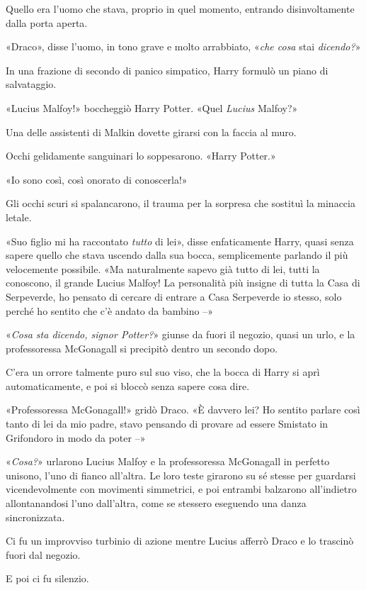 Quello era l’uomo che stava, proprio in quel momento, entrando disinvoltamente dalla porta aperta.

«Draco», disse l’uomo, in tono grave e molto arrabbiato, «\textit{che cosa} stai \textit{dicendo?}»

In una frazione di secondo di panico simpatico, Harry formulò un piano di salvataggio.

«Lucius Malfoy!» boccheggiò Harry Potter. «Quel \textit{Lucius} Malfoy?»

Una delle assistenti di Malkin dovette girarsi con la faccia al muro.

Occhi gelidamente sanguinari lo soppesarono. «Harry Potter.»

«Io sono così, così onorato di conoscerla!»

Gli occhi scuri si spalancarono, il trauma per la sorpresa che sostituì la minaccia letale.

«Suo figlio mi ha raccontato \textit{tutto} di lei», disse enfaticamente Harry, quasi senza sapere quello che stava uscendo dalla sua bocca, semplicemente parlando il più velocemente possibile. «Ma naturalmente sapevo già tutto di lei, tutti la conoscono, il grande Lucius Malfoy! La personalità più insigne di tutta la Casa di Serpeverde, ho pensato di cercare di entrare a Casa Serpeverde io stesso, solo perché ho sentito che c’è andato da bambino –»

«\textit{Cosa sta dicendo, signor Potter?}» giunse da fuori il negozio, quasi un urlo, e la professoressa McGonagall si precipitò dentro un secondo dopo.

C’era un orrore talmente puro sul suo viso, che la bocca di Harry si aprì automaticamente, e poi si bloccò senza sapere cosa dire.

«Professoressa McGonagall!» gridò Draco. «È davvero lei? Ho sentito parlare così tanto di lei da mio padre, stavo pensando di provare ad essere Smistato in Grifondoro in modo da poter –»

«\textit{Cosa?}» urlarono Lucius Malfoy e la professoressa McGonagall in perfetto unisono, l’uno di fianco all’altra. Le loro teste girarono su sé stesse per guardarsi vicendevolmente con movimenti simmetrici, e poi entrambi balzarono all’indietro allontanandosi l’uno dall’altra, come se stessero eseguendo una danza sincronizzata.

Ci fu un improvviso turbinio di azione mentre Lucius afferrò Draco e lo trascinò fuori dal negozio.

E poi ci fu silenzio.


